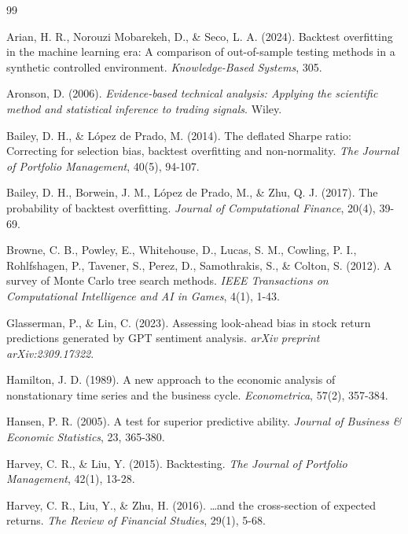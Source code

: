 \documentclass[12pt,a4paper,oneside]{book}
\theoremstyle{definition}
\begin{document}
\begin{thebibliography}{99}

Arian, H. R., Norouzi Mobarekeh, D., \& Seco, L. A. (2024). Backtest overfitting in the machine learning era: A comparison of out-of-sample testing methods in a synthetic controlled environment. \textit{Knowledge-Based Systems}, 305.

Aronson, D. (2006). \textit{Evidence-based technical analysis: Applying the scientific method and statistical inference to trading signals}. Wiley.

Bailey, D. H., \& L\'opez de Prado, M. (2014). The deflated Sharpe ratio: Correcting for selection bias, backtest overfitting and non-normality. \textit{The Journal of Portfolio Management}, 40(5), 94-107.

Bailey, D. H., Borwein, J. M., L\'opez de Prado, M., \& Zhu, Q. J. (2017). The probability of backtest overfitting. \textit{Journal of Computational Finance}, 20(4), 39-69.

Browne, C. B., Powley, E., Whitehouse, D., Lucas, S. M., Cowling, P. I., Rohlfshagen, P., Tavener, S., Perez, D., Samothrakis, S., \& Colton, S. (2012). A survey of Monte Carlo tree search methods. \textit{IEEE Transactions on Computational Intelligence and AI in Games}, 4(1), 1-43.

Glasserman, P., \& Lin, C. (2023). Assessing look-ahead bias in stock return predictions generated by GPT sentiment analysis. \textit{arXiv preprint arXiv:2309.17322}.

Hamilton, J. D. (1989). A new approach to the economic analysis of nonstationary time series and the business cycle. \textit{Econometrica}, 57(2), 357-384.

Hansen, P. R. (2005). A test for superior predictive ability. \textit{Journal of Business \& Economic Statistics}, 23, 365-380.

Harvey, C. R., \& Liu, Y. (2015). Backtesting. \textit{The Journal of Portfolio Management}, 42(1), 13-28.

Harvey, C. R., Liu, Y., \& Zhu, H. (2016). \ldots and the cross-section of expected returns. \textit{The Review of Financial Studies}, 29(1), 5-68.


\end{thebibliography}
\end{document}
